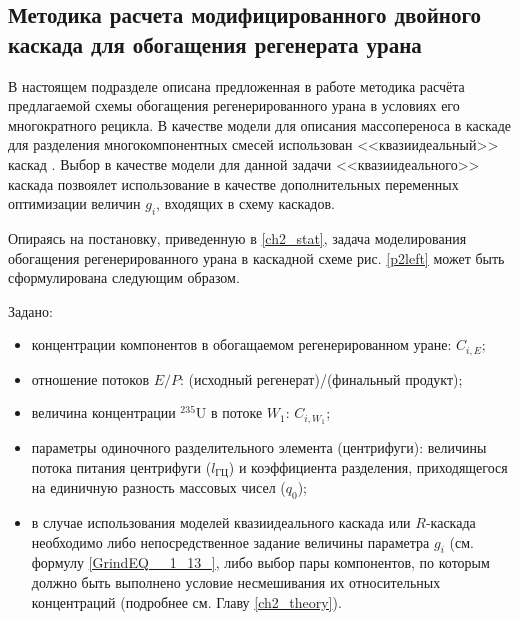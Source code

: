 
\subsection{Методика расчета модифицированного двойного каскада для обогащения регенерата урана}\label{statement}

В настоящем подразделе описана предложенная в работе методика расчёта предлагаемой схемы обогащения регенерированного урана в условиях его многократного рецикла. В качестве модели для описания массопереноса в каскаде для разделения многокомпонентных смесей использован <<квазиидеальный>> каскад \cite{sazykinKvaziidealnyeKaskadyDlya2000}. Выбор в качестве модели для данной задачи <<квазиидеального>> каскада позвоялет использование в качестве дополнительных переменных оптимизации величин $g_{i}$, входящих в схему каскадов. 


Опираясь на постановку, приведенную в \ref{ch2_stat}, задача моделирования обогащения регенерированного урана в каскадной схеме рис. \ref{p2left} может быть сформулирована следующим образом.

Задано:

\begin{itemize}
    \item концентрации компонентов в обогащаемом регенерированном уране: $C_{i,{E}}$; 
    \item отношение потоков $E/P$: (исходный регенерат)/(финальный продукт);
    \item величина концентрации $^{235}$U в потоке $W_{1}$: $C_{i,{W_1}}$;
    \item параметры одиночного разделительного элемента (центрифуги): величины потока питания центрифуги ($l_\textit{ГЦ}$) и коэффициента разделения, приходящегося на единичную разность массовых чисел ($q_{0}$);
    \item в случае использования моделей квазиидеального каскада или $R$-каскада необходимо либо непосредственное задание величины параметра $g_i$ (см. формулу \ref{GrindEQ__1_13_}, либо выбор пары компонентов, по которым должно быть выполнено условие несмешивания их относительных концентраций (подробнее см. Главу \ref{ch2_theory}).
\end{itemize}

